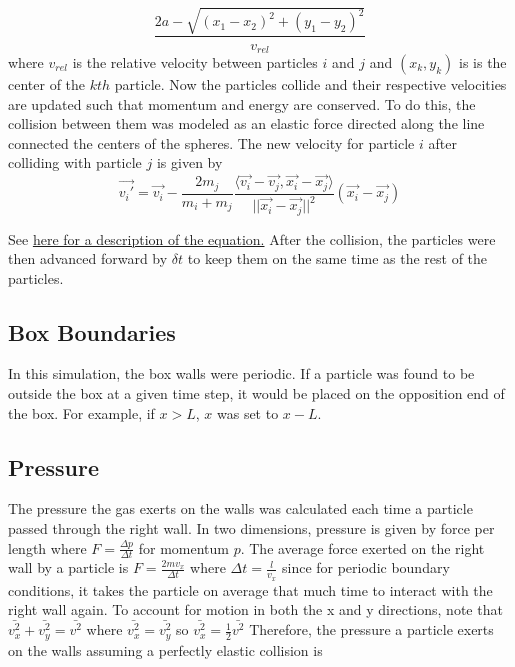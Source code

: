 \documentclass[12pt]{amsart}
\begin{document}
$$\frac{2a - \sqrt{(x_1 - x_2)^2 + (y_1 - y_2)^2}}{v_{rel}}  $$ 
\newline
where $v_{rel}$ is the relative velocity between particles $i$ and $j$ and $(x_k,y_k)$ is is the center of the $kth$ particle.  Now the particles collide and their respective velocities are updated such that momentum and energy are conserved.  To do this, the collision between them was modeled as an elastic force directed along the line connected the centers of the spheres.  The new velocity for particle $i$ after colliding with particle $j$ is given by
$$ \vec{v_i'} = \vec{v_i} - \frac{2 m_j}{m_i + m_j} \frac{\langle \vec{v_i} - \vec{v_j}, \vec{x_i} - \vec{x_j}{ \rangle}}{||\vec{x_i} - \vec{x_j}||^2} (\vec{x_i} - \vec{x_j}) $$
  
 See \href{https://en.wikipedia.org/wiki/Elastic_collision#Two-dimensional_collision_with_two_moving_objects}{here for a description of the equation.}   After the collision, the particles were then advanced forward by $\delta t$ to keep them on the same time as the rest of the particles.
 
\subsection{Box Boundaries}

In this simulation, the box walls were periodic.  If a particle was found to be outside the box at a given time step, it would be placed on the opposition end of the box.  For example, if $x > L$, $x$ was set to $x - L$.  

\subsection{Pressure}

The pressure the gas exerts on the walls was calculated each time a particle passed through the right wall.  In two dimensions, pressure is given by force per length where $F = \frac{\Delta p}{\Delta t}$ for momentum $p$.  The average force exerted on the right wall by a particle is $F = \frac{2 m v_x}{\Delta t}$ where $\Delta t = \frac{l}{v_x}$ since for periodic boundary conditions, it takes the particle on average that much time to interact with the right wall again.  To account for motion in both the x and y directions, note that $\bar{v_x^2} + \bar{v_y^2} = \bar{v^2}$ where $\bar{v_x^2} = \bar{v_y^2}$ so $\bar{v_x^2} = \frac{1}{2} \bar{v^2}$ Therefore, the pressure a particle exerts on the walls assuming a perfectly elastic collision is
\end{document}
